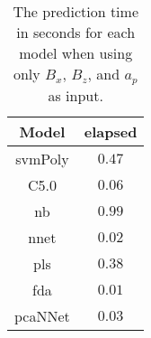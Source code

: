 \begin{table}[!ht]
	\centering
	\begin{tabular}{|c|c|}
		\hline
		Model & elapsed \\ \hline
		svmPoly & $0.47$ \\ \hline
		C5.0 & $0.06$ \\ \hline
		nb & $0.99$ \\ \hline
		nnet & $0.02$ \\ \hline
		pls & $0.38$ \\ \hline
		fda & $0.01$ \\ \hline
		pcaNNet & $0.03$ \\ \hline
	\end{tabular}
	\caption{The prediction time in seconds for each model when using only $B_{x}$, $B_{z}$, and $a_{p}$ as input.}
	\label{tab:time:xzap:predict}
\end{table}
